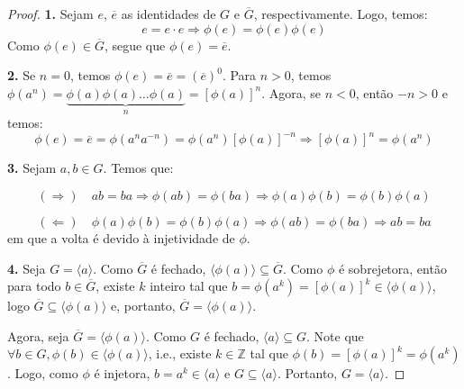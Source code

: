 	\begin{proof}
		\textbf{1.} Sejam $e$, $\overline{e}$ as identidades de $G$ e $\overline{G}$, respectivamente. Logo, temos:
		\begin{equation*}
		e = e\cdot e \Rightarrow \phi (e) = \phi (e)\phi (e)
		\end{equation*} 
		Como $\phi (e)\in \overline{G}$, segue que $\phi(e) = \overline{e}$. 
		\par\vspace{0.4cm}
		\textbf{2.} Se $n=0$, temos $\phi (e) = \overline{e} = (\overline{e})^0$. 
		Para $n>0$, temos $\phi (a^n) = \underbrace{\phi (a)\phi (a)\dots \phi (a)}_{n} = [\phi (a)]^n$.
		Agora, se $n<0$, então $-n>0$ e temos:
		\begin{equation*}
		\phi (e) = \overline{e} = \phi (a^n a^{-n}) = \phi (a^n)[\phi (a)]^{-n} \Rightarrow [\phi (a)]^n = \phi (a^n)
		\end{equation*}
		\par\vspace{0.4cm}
		\textbf{3.} Sejam $a,b \in G$. Temos que:
		\par
		\begin{equation*}
		(\Rightarrow) \hspace{12pt}ab = ba \Rightarrow \phi (ab) = \phi (ba) \Rightarrow \phi (a)\phi (b) = \phi (b)\phi (a)
		\end{equation*}
		\par
		\begin{equation*}
		(\Leftarrow)\hspace{12pt}\phi(a)\phi(b) = \phi(b)\phi(a) \Rightarrow \phi(ab) = \phi(ba) \Rightarrow ab = ba
		\end{equation*}
		em que a volta é devido à injetividade de $\phi$.
		\par\vspace{0.4cm}
		\textbf{4.} Seja $G = \langle a \rangle $. Como $\overline{G}$ é fechado, $\langle \phi(a)\rangle \subseteq \overline{G}$. Como $\phi$ é sobrejetora, então para todo $b\in\overline{G}$, existe $k$ inteiro tal que $b = \phi(a^k) = [\phi(a)]^k \in\langle \phi(a)\rangle $, logo $\overline{G}\subseteq\langle \phi(a)\rangle$ e, portanto, $\overline{G} = \langle \phi(a)\rangle.$
		\par\vspace{0.3cm} Agora, seja $\overline{G} = \langle \phi(a)\rangle$. Como $G$ é fechado, $\langle a\rangle \subseteq G$. Note que $\forall b\in G, \phi(b)\in\langle \phi(a)\rangle$, i.e., existe $k\in\mathbb{Z}$ tal que $\phi(b) = [\phi(a)]^k = \phi(a^k)$. Logo, como $\phi$ é injetora, $b = a^k\in\langle a\rangle $ e $G \subseteq \langle a\rangle$. Portanto, $G = \langle a\rangle$. 

\end{proof}
